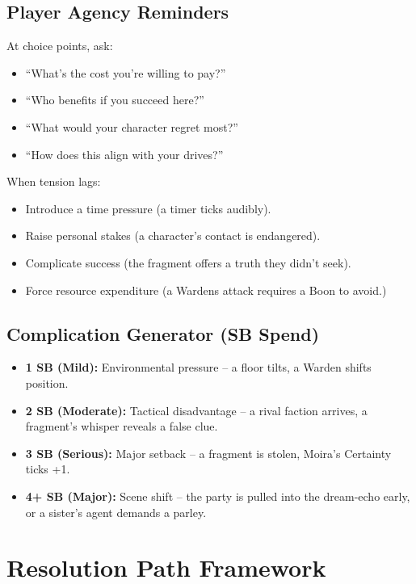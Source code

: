 \documentclass[11pt]{article}
\begin{document}
\subsection{Player Agency Reminders}

At choice points, ask:
\begin{itemize}
    \item ``What's the cost you're willing to pay?''
    \item ``Who benefits if you succeed here?''
    \item ``What would your character regret most?''
    \item ``How does this align with your drives?''
\end{itemize}

When tension lags:
\begin{itemize}
    \item Introduce a time pressure (a timer ticks audibly).
    \item Raise personal stakes (a character's contact is endangered).
    \item Complicate success (the fragment offers a truth they didn't seek).
    \item Force resource expenditure (a Wardens attack requires a Boon to avoid.)
\end{itemize}

\subsection{Complication Generator (SB Spend)}

\begin{itemize}
    \item \textbf{1 SB (Mild):} Environmental pressure -- a floor tilts, a Warden shifts position.
    \item \textbf{2 SB (Moderate):} Tactical disadvantage -- a rival faction arrives, a fragment's whisper reveals a false clue.
    \item \textbf{3 SB (Serious):} Major setback -- a fragment is stolen, Moira's Certainty ticks +1.
    \item \textbf{4+ SB (Major):} Scene shift -- the party is pulled into the dream-echo early, or a sister's agent demands a parley.
\end{itemize}

\section{Resolution Path Framework}
\end{document}
